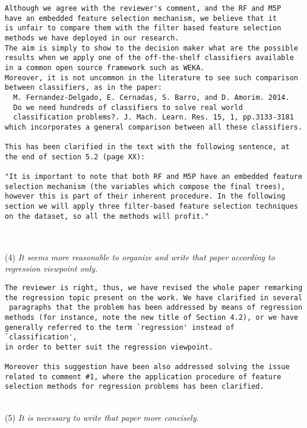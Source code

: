 \documentclass[preprint]{elsarticle}
\begin{document}
\begin{verbatim}
Although we agree with the reviewer's comment, and the RF and M5P 
have an embedded feature selection mechanism, we believe that it 
is unfair to compare them with the filter based feature selection 
methods we have deployed in our research. 
The aim is simply to show to the decision maker what are the possible 
results when we apply one of the off-the-shelf classifiers available 
in a common open source framework such as WEKA. 
Moreover, it is not uncommon in the literature to see such comparison 
between classifiers, as in the paper:
  M. Fernandez-Delgado, E. Cernadas, S. Barro, and D. Amorim. 2014. 
  Do we need hundreds of classifiers to solve real world 
  classification problems?. J. Mach. Learn. Res. 15, 1, pp.3133-3181
which incorporates a general comparison between all these classifiers.

This has been clarified in the text with the following sentence, at the end of section 5.2 (page XX):

"It is important to note that both RF and M5P have an embedded feature selection mechanism (the variables which compose the final trees), however this is part of their inherent procedure. In the following section we will apply three filter-based feature selection techniques on the dataset, so all the methods will profit."


\end{verbatim}


~\\
\noindent (4) \emph{It seems more reasonable to organize and write that paper according to regression viewpoint only. } 

\begin{verbatim}
The reviewer is right, thus, we have revised the whole paper remarking 
the regression topic present on the work. We have clarified in several
 paragraphs that the problem has been addressed by means of regression 
methods (for instance, note the new title of Section 4.2), or we have 
generally referred to the term `regression' instead of `classification', 
in order to better suit the regression viewpoint.

Moreover this suggestion have been also addressed solving the issue 
related to comment #1, where the application procedure of feature 
selection methods for regression problems has been clarified. 
\end{verbatim}


~\\
\noindent (5) \emph{It is necessary to write that paper more concisely. } 
\end{document}
